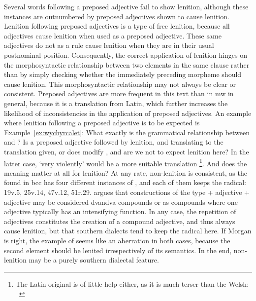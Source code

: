 Several words following a preposed adjective fail to show lenition, although these instances are outnumbered by preposed adjectives shown to cause lenition.
Lenition following preposed adjectives is a type of free lenition, because all adjectives cause lenition when used as a preposed adjective.
These same adjectives do not as a rule cause lenition when they are in their usual postnominal position.
Consequently, the correct application of lenition hinges on the morphosyntactic relationship between two elements in the same clause rather than by simply checking whether the immediately preceding morpheme should cause lenition.
This morphosyntactic relationship may not always be clear or consistent.
Preposed adjectives are more frequent in this text than in \gls{mw} in general, because it is a translation from Latin, which further increases the likelihood of inconsistencies in the application of preposed adjectives.
An example where lenition following a  preposed adjective is to be expected is Example~\ref{ex:wychyrcalet}:
What exactly is the grammatical relationship between  and ?
Is  a preposed adjective followed by lenition, and translating to the translation given, or does  modify , and are we not to expect lenition here?
In the latter case, `very violently' would be a more suitable translation%
\footnote{The Latin original is of little help either, as it is much terser than the Welsh: ~\autocite[42--43]{Geo_History09}}.
And does the meaning matter at all for lenition?
At any rate, non-lenition is consistent, as the  found in \gls{bcc} has four different instances of , and each of them keeps the radical: 19v.5, 25v.14, 47v.12, 51r.29.
\Textcite[31--32]{morgan_y_1952} argues that constructions of the type   + adjective + adjective  may be considered dvandva compounds or as compounds where one adjective typically has an intensifying function.
In any case, the repetition of adjectives constitutes the creation of a compound adjective, and thus always cause lenition, but that southern dialects tend to keep the radical here.
If Morgan is right, the example of   seems like an aberration in both cases, because the second element should be lenited irrespectively of its semantics.
In the end, non-lenition may be a purely southern dialectal feature.

